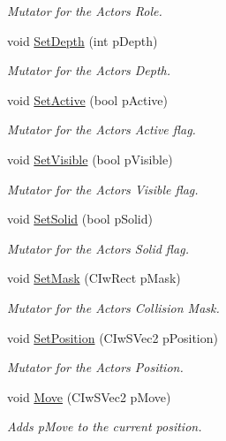 \begin{DoxyCompactItemize}
\begin{DoxyCompactList}\small\item\em Mutator for the Actors Role. \end{DoxyCompactList}\item 
void \hyperlink{class_i_ty_actor_a23072345bc259b4a18c702238e3f9249}{SetDepth} (int pDepth)
\begin{DoxyCompactList}\small\item\em Mutator for the Actors Depth. \end{DoxyCompactList}\item 
void \hyperlink{class_i_ty_actor_ad2a1db314df31d4c1114132154644e2d}{SetActive} (bool pActive)
\begin{DoxyCompactList}\small\item\em Mutator for the Actors Active flag. \end{DoxyCompactList}\item 
void \hyperlink{class_i_ty_actor_af1f3341d3cb568b2420cfce2a570e507}{SetVisible} (bool pVisible)
\begin{DoxyCompactList}\small\item\em Mutator for the Actors Visible flag. \end{DoxyCompactList}\item 
void \hyperlink{class_i_ty_actor_acc5fe8fe823f7a8f95a6bbe505ebe95a}{SetSolid} (bool pSolid)
\begin{DoxyCompactList}\small\item\em Mutator for the Actors Solid flag. \end{DoxyCompactList}\item 
void \hyperlink{class_i_ty_actor_aa119f79b398074a9b9d6281e7b463fee}{SetMask} (CIwRect pMask)
\begin{DoxyCompactList}\small\item\em Mutator for the Actors Collision Mask. \end{DoxyCompactList}\item 
void \hyperlink{class_i_ty_actor_a9b37537093a7b6c412d6f1379b4eabb9}{SetPosition} (CIwSVec2 pPosition)
\begin{DoxyCompactList}\small\item\em Mutator for the Actors Position. \end{DoxyCompactList}\item 
void \hyperlink{class_i_ty_actor_acb61eaa07f90fbd2106e75ca0fd1a1c0}{Move} (CIwSVec2 pMove)
\begin{DoxyCompactList}\small\item\em Adds pMove to the current position. \end{DoxyCompactList}\end{DoxyCompactItemize}
